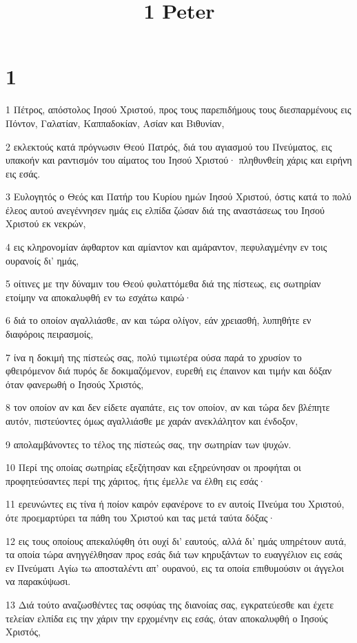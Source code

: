 

\title{1 Peter}


\chapter{1}

\par 1 Πέτρος, απόστολος Ιησού Χριστού, προς τους παρεπιδήμους τους διεσπαρμένους εις Πόντον, Γαλατίαν, Καππαδοκίαν, Ασίαν και Βιθυνίαν,
\par 2 εκλεκτούς κατά πρόγνωσιν Θεού Πατρός, διά του αγιασμού του Πνεύματος, εις υπακοήν και ραντισμόν του αίματος του Ιησού Χριστού· πληθυνθείη χάρις και ειρήνη εις εσάς.
\par 3 Ευλογητός ο Θεός και Πατήρ του Κυρίου ημών Ιησού Χριστού, όστις κατά το πολύ έλεος αυτού ανεγέννησεν ημάς εις ελπίδα ζώσαν διά της αναστάσεως του Ιησού Χριστού εκ νεκρών,
\par 4 εις κληρονομίαν άφθαρτον και αμίαντον και αμάραντον, πεφυλαγμένην εν τοις ουρανοίς δι' ημάς,
\par 5 οίτινες με την δύναμιν του Θεού φυλαττόμεθα διά της πίστεως, εις σωτηρίαν ετοίμην να αποκαλυφθή εν τω εσχάτω καιρώ·
\par 6 διά το οποίον αγαλλιάσθε, αν και τώρα ολίγον, εάν χρειασθή, λυπηθήτε εν διαφόροις πειρασμοίς,
\par 7 ίνα η δοκιμή της πίστεώς σας, πολύ τιμιωτέρα ούσα παρά το χρυσίον το φθειρόμενον διά πυρός δε δοκιμαζόμενον, ευρεθή εις έπαινον και τιμήν και δόξαν όταν φανερωθή ο Ιησούς Χριστός,
\par 8 τον οποίον αν και δεν είδετε αγαπάτε, εις τον οποίον, αν και τώρα δεν βλέπητε αυτόν, πιστεύοντες όμως αγαλλιάσθε με χαράν ανεκλάλητον και ένδοξον,
\par 9 απολαμβάνοντες το τέλος της πίστεώς σας, την σωτηρίαν των ψυχών.
\par 10 Περί της οποίας σωτηρίας εξεζήτησαν και εξηρεύνησαν οι προφήται οι προφητεύσαντες περί της χάριτος, ήτις έμελλε να έλθη εις εσάς·
\par 11 ερευνώντες εις τίνα ή ποίον καιρόν εφανέρονε το εν αυτοίς Πνεύμα του Χριστού, ότε προεμαρτύρει τα πάθη του Χριστού και τας μετά ταύτα δόξας·
\par 12 εις τους οποίους απεκαλύφθη ότι ουχί δι' εαυτούς, αλλά δι' ημάς υπηρέτουν αυτά, τα οποία τώρα ανηγγέλθησαν προς εσάς διά των κηρυξάντων το ευαγγέλιον εις εσάς εν Πνεύματι Αγίω τω αποσταλέντι απ' ουρανού, εις τα οποία επιθυμούσιν οι άγγελοι να παρακύψωσι.
\par 13 Διά τούτο αναζωσθέντες τας οσφύας της διανοίας σας, εγκρατεύεσθε και έχετε τελείαν ελπίδα εις την χάριν την ερχομένην εις εσάς, όταν αποκαλυφθή ο Ιησούς Χριστός,
